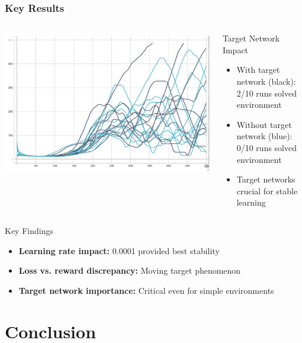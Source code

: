 \documentclass[
    9pt,
    aspectratio=169,
]{beamer}
\begin{document}
\begin{frame}
\frametitle{Key Results}
\begin{columns}
\includegraphics[width=\textwidth]{media/target_ablation.png}
\begin{block}{Target Network Impact}
    \begin{itemize}
        \item With target network (black): 2/10 runs solved environment
        \item Without target network (blue): 0/10 runs solved environment
        \item Target networks crucial for stable learning
    \end{itemize}
\end{block}
\end{columns}

\begin{block}{Key Findings}
    \begin{itemize}
        \item \textbf{Learning rate impact:} 0.0001 provided best stability
        \item \textbf{Loss vs. reward discrepancy:} Moving target phenomenon
        \item \textbf{Target network importance:} Critical even for simple environments
    \end{itemize}
\end{block}
\end{frame}

\section{Conclusion}
\end{document}
